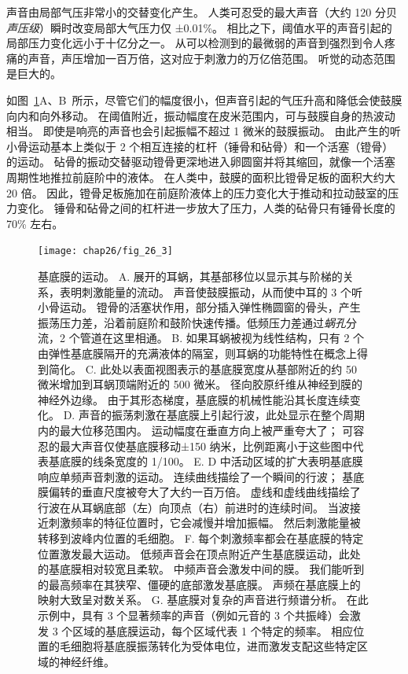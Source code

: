 声音由局部气压非常小的交替变化产生。
人类可忍受的最大声音（大约 120 分贝\textit{声压级}）瞬时改变局部大气压力仅 ±0.01\%。
相比之下，阈值水平的声音引起的局部压力变化远小于十亿分之一。
从可以检测到的最微弱的声音到强烈到令人疼痛的声音，声压增加一百万倍，这对应于刺激力的万亿倍范围。
听觉的动态范围是巨大的。


如图~\ref{fig:26_3}A、B~所示，尽管它们的幅度很小，但声音引起的气压升高和降低会使鼓膜向内和向外移动。
在阈值附近，振动幅度在皮米范围内，可与鼓膜自身的热波动相当。
即使是响亮的声音也会引起振幅不超过 1 微米的鼓膜振动。
由此产生的听小骨运动基本上类似于 2 个相互连接的杠杆（锤骨和砧骨）和一个活塞（镫骨）的运动。
砧骨的振动交替驱动镫骨更深地进入卵圆窗并将其缩回，就像一个活塞周期性地推拉前庭阶中的液体。
在人类中，鼓膜的面积比镫骨足板的面积大约大 20 倍。
因此，镫骨足板施加在前庭阶液体上的压力变化大于推动和拉动鼓室的压力变化。
锤骨和砧骨之间的杠杆进一步放大了压力，人类的砧骨只有锤骨长度的 70\% 左右。


\begin{figure}[htbp]
	\centering
	\texttt{[image: chap26/fig\_26\_3]}
	\caption{基底膜的运动。
		A. 展开的耳蜗，其基部移位以显示其与阶梯的关系，表明刺激能量的流动。
		声音使鼓膜振动，从而使中耳的 3 个听小骨运动。
		镫骨的活塞状作用，部分插入弹性椭圆窗的骨头，产生振荡压力差，沿着前庭阶和鼓阶快速传播。低频压力差通过\textit{蜗孔}分流，2 个管道在这里相通。
		B. 如果耳蜗被视为线性结构，只有 2 个由弹性基底膜隔开的充满液体的隔室，则耳蜗的功能特性在概念上得到简化。
		C. 此处以表面视图表示的基底膜宽度从基部附近的约 50 微米增加到耳蜗顶端附近的 500 微米。
		径向胶原纤维从神经到膜的神经外边缘。
		由于其形态梯度，基底膜的机械性能沿其长度连续变化。
		D. 声音的振荡刺激在基底膜上引起行波，此处显示在整个周期内的最大位移范围内。
		运动幅度在垂直方向上被严重夸大了；
		可容忍的最大声音仅使基底膜移动±150 纳米，比例距离小于这些图中代表基底膜的线条宽度的 1/100。
		E. D 中活动区域的扩大表明基底膜响应单频声音刺激的运动。
		连续曲线描绘了一个瞬间的行波；
		基底膜偏转的垂直尺度被夸大了大约一百万倍。
		虚线和虚线曲线描绘了行波在从耳蜗底部（左）向顶点（右）前进时的连续时间。
		当波接近刺激频率的特征位置时，它会减慢并增加振幅。
		然后刺激能量被转移到波峰内位置的毛细胞。
		F. 每个刺激频率都会在基底膜的特定位置激发最大运动。
		低频声音会在顶点附近产生基底膜运动，此处的基底膜相对较宽且柔软。
		中频声音会激发中间的膜。
		我们能听到的最高频率在其狭窄、僵硬的底部激发基底膜。
		声频在基底膜上的映射大致呈对数关系。
		G. 基底膜对复杂的声音进行频谱分析。
		在此示例中，具有 3 个显著频率的声音（例如元音的 3 个共振峰）会激发 3 个区域的基底膜运动，每个区域代表 1 个特定的频率。
		相应位置的毛细胞将基底膜振荡转化为受体电位，进而激发支配这些特定区域的神经纤维。}
	\label{fig:26_3}
\end{figure}


